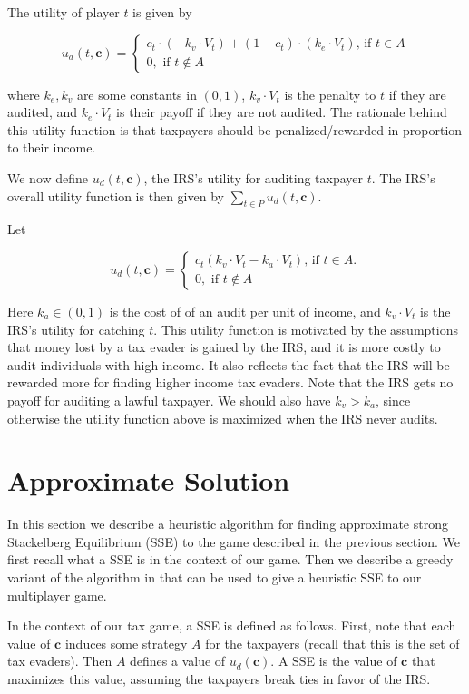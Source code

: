 \documentclass[paper=letter, fontsize=11pt]{article}
\begin{document}
The utility of player $t$ is given by

$$
u_a(t,\bm{c})=
\begin{cases}
c_t \cdot (-k_v \cdot V_t)  + (1-c_t) \cdot (k_e \cdot V_t)  \text{, if $t \in A$}\\
0, \text{ if $t \notin A$}
\end{cases}
$$

where $k_e, k_v$ are some constants in $(0,1)$, $k_v \cdot V_t$ is the penalty to $t$ if they are audited, and $k_e \cdot V_t$ is their payoff if they are not audited.  The rationale behind this utility function is that taxpayers should be penalized/rewarded in proportion to their income.

We now define $u_d(t, \bm{c})$, the IRS's utility for auditing taxpayer $t$. The IRS's overall utility function is then given by $\sum_{t \in P} u_d(t, \bm{c})$.

Let

$$
u_d(t,\bm{c})=
\begin{cases}
c_t(k_v \cdot V_t - k_a\cdot V_t) \text{, if $t \in A$.}\\
0, \text{ if $t \notin A$}
\end{cases}
$$

Here $k_a \in (0,1)$ is the cost of of an audit per unit of income, and $k_v \cdot V_t$ is the IRS's utility for catching $t$. This utility function is motivated by the assumptions that money lost by a tax evader is gained by the IRS, and it is more costly to audit individuals with high income. It also reflects the fact that the IRS will be rewarded more for finding higher income tax evaders. Note that the IRS gets no payoff for auditing a lawful taxpayer. We should also have $k_v > k_a$, since otherwise the utility function above is maximized when the IRS never audits.

\section*{Approximate Solution}

In this section we describe a heuristic algorithm for finding approximate strong Stackelberg Equilibrium (SSE) to the game described in the previous section. We first recall what a SSE is in the context of our game. Then we describe a greedy variant of the algorithm in \cite{conitzer2006computing} that can be used to give a heuristic SSE to our multiplayer game.

In the context of our tax game, a SSE is defined as follows. First, note that each value of $\bm{c}$ induces some strategy $A$ for the taxpayers (recall that this is the set of tax evaders). Then $A$ defines a value of $u_d(\bm{c})$. A SSE is the value of $\bm{c}$ that maximizes this value, assuming the taxpayers break ties in favor of the IRS.
\end{document}
